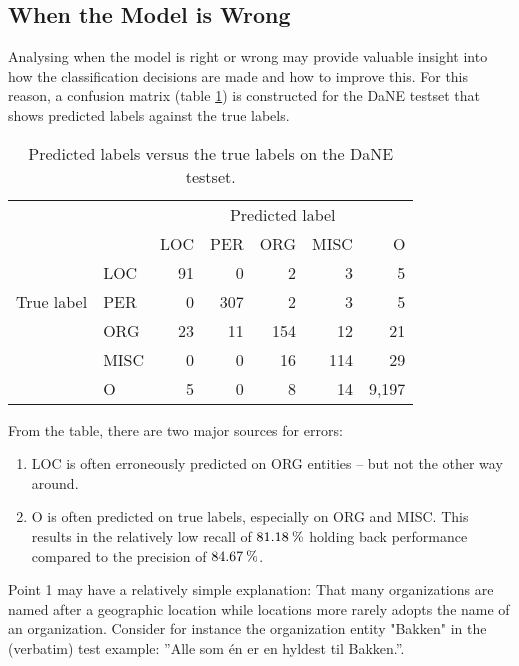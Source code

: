 \documentclass[main.tex]{subfiles}
\begin{document}
\subsection{When the Model is Wrong}

Analysing when the model is right or wrong may provide valuable insight into how the classification decisions are made and how to improve this.
For this reason, a confusion matrix (table \ref{tab:pred-true-confmat}) is constructed for the DaNE testset that shows predicted labels against the true labels\footnotemark.


\begin{table}[H]
    \centering
    \small
    \begin{tabular}{l l | r r r r r }
        & &	\multicolumn{5}{c}{Predicted label}	\\
        \multirow{5}{*}{True label} & & LOC & PER & ORG & MISC & O \\\hline
            & LOC  & 91 & 0    & 2   & 3   & 5   \\
            & PER  & 0  & 307  & 2   & 3   & 5   \\
            & ORG  & 23 & 11   & 154 & 12  & 21  \\
            & MISC & 0  & 0    & 16  & 114 & 29  \\
            & O    & 5  & 0    & 8   & 14  & 9,197
    \end{tabular}
    \caption{Predicted labels versus the true labels on the DaNE testset.}
    \label{tab:pred-true-confmat}
\end{table}\noindent
From the table, there are two major sources for errors:
\begin{enumerate}
    \item LOC is often erroneously predicted on ORG entities -- but not the other way around.
    \item O is often predicted on true labels, especially on ORG and MISC. This results in the relatively low recall of $81.18\:\text{\%{}}$ holding back performance compared to the precision of $84.67\:\text{\%{}}$.
\end{enumerate}
Point 1 may have a relatively simple explanation: 
That many organizations are named after a geographic location while locations more rarely adopts the name of an organization.
Consider for instance the organization entity "Bakken" in the (verbatim) test example: ''Alle som én er en hyldest til Bakken.''.
\end{document}
